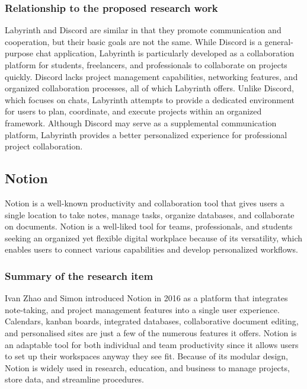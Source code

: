 \documentclass{FastFyp}
\begin{document}
\subsubsection{Relationship to the proposed research work}
Labyrinth and Discord are similar in that they promote communication and cooperation, but their basic goals are not the same.  While Discord is a general-purpose chat application, Labyrinth is particularly developed as a collaboration platform for students, freelancers, and professionals to collaborate on projects quickly.  Discord lacks project management capabilities, networking features, and organized collaboration processes, all of which Labyrinth offers.  Unlike Discord, which focuses on chats, Labyrinth attempts to provide a dedicated environment for users to plan, coordinate, and execute projects within an organized framework.  Although Discord may serve as a supplemental communication platform, Labyrinth provides a better personalized experience for professional project collaboration.

\subsection{Notion}
Notion is a well-known productivity and collaboration tool that gives users a single location to take notes, manage tasks, organize databases, and collaborate on documents.  Notion is a well-liked tool for teams, professionals, and students seeking an organized yet flexible digital workplace because of its versatility, which enables users to connect various capabilities and develop personalized workflows.
\subsubsection{Summary of the research item}
Ivan Zhao and Simon introduced Notion in 2016 as a platform that integrates note-taking, and project management features into a single user experience.  Calendars, kanban boards, integrated databases, collaborative document editing, and personalised sites are just a few of the numerous features it offers.   Notion is an adaptable tool for both individual and team productivity since it allows users to set up their workspaces anyway they see fit.   Because of its modular design, Notion is widely used in research, education, and business to manage projects, store data, and streamline procedures.
\end{document}
